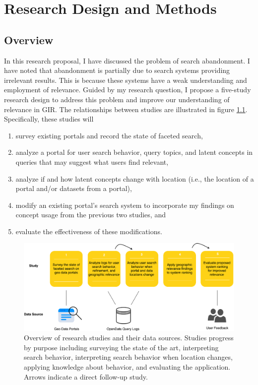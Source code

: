 \chapter{Research Design and Methods} \label{ch:[chapter 5 label]}

\section{Overview}
In this research proposal, I have discussed the problem of search abandonment. I have noted that abandonment is partially due to search systems providing irrelevant results. This is because these systems have a weak understanding and employment of relevance. Guided by my research question, I propose a five-study research design to address this problem and improve our understanding of relevance in GIR. The relationships between studies are illustrated in figure \ref{fig:Methods_Overview}. Specifically, these studies will

\begin{enumerate}
    \item survey existing portals and record the state of faceted  search,
    \item analyze a portal for user search behavior, query topics, and latent concepts in queries that may suggest what users find relevant,
    \item analyze if and how latent concepts change with location (i.e., the location of a portal and/or datasets from a portal),
    \item modify an existing portal's search system to incorporate my findings on concept usage from the previous two studies, and
    \item evaluate the effectiveness of these modifications.
\end{enumerate}

\begin{figure}[H]
    \centering
    \includegraphics[width=1\textwidth]{../figures/Methods_Overview.png}
    \caption{Overview of research studies and their data sources. Studies progress by purpose including surveying the state of the art, interpreting search behavior, interpreting search behavior when location changes, applying knowledge about behavior, and evaluating the application. Arrows indicate a direct follow-up study.}
    \label{fig:Methods_Overview}
\end{figure}

